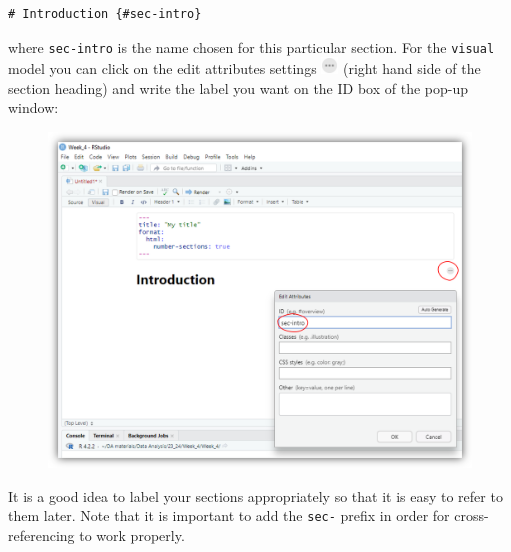 \documentclass[
  letterpaper,
  DIV=11,
  numbers=noendperiod]{scrartcl}
\begin{document}
\begin{verbatim}
# Introduction {#sec-intro}
\end{verbatim}

where \texttt{sec-intro} is the name chosen for this particular section.
For the \texttt{visual} model you can click on the edit attributes
settings
\includegraphics[width=0.17708in,height=\textheight]{images/threedots.png}
(right hand side of the section heading) and write the label you want on
the ID box of the pop-up window:

\begin{figure}

{\centering \includegraphics{images/quarto4.png}

}

\end{figure}

\begin{tcolorbox}[enhanced jigsaw, colback=white, toprule=.15mm, arc=.35mm, colbacktitle=quarto-callout-important-color!10!white, titlerule=0mm, colframe=quarto-callout-important-color-frame, title=\textcolor{quarto-callout-important-color}{\faExclamation}\hspace{0.5em}{Important}, bottomtitle=1mm, toptitle=1mm, coltitle=black, rightrule=.15mm, opacityback=0, bottomrule=.15mm, breakable, leftrule=.75mm, left=2mm, opacitybacktitle=0.6]

It is a good idea to label your sections appropriately so that it is
easy to refer to them later. Note that it is important to add the
\texttt{sec-} prefix in order for cross-referencing to work properly.

\end{tcolorbox}
\end{document}
